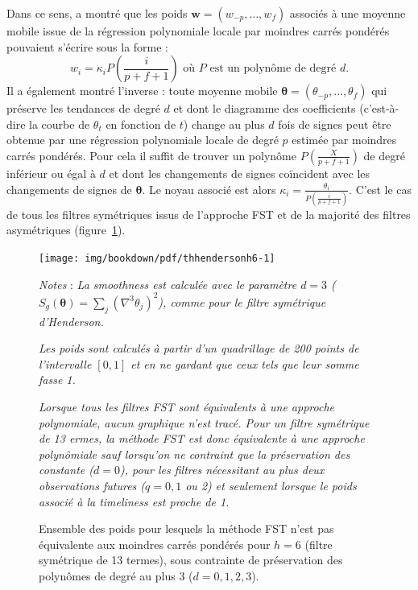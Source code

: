\documentclass[
  12pt,
  a4paper,french]{article}
\newcommand\1{\mathds{1}}
\begin{document}
Dans ce sens, \textcite{henderson1916note} a montré que les poids \(\boldsymbol w=(w_{-p},\dots, w_{f})\) associés à une moyenne mobile issue de la régression polynomiale locale par moindres carrés pondérés pouvaient s'écrire sous la forme :
\[
w_i = \kappa_i P\left(\frac{i}{p+f+1}\right)\text{ où }P\text{ est un polynôme de degré }d.
\]
Il a également montré l'inverse : toute moyenne mobile \(\boldsymbol \theta=(\theta_{-p},\dots, \theta_{f})\) qui préserve les tendances de degré \(d\) et dont le diagramme des coefficients (c'est-à-dire la courbe de \(\theta_t\) en fonction de \(t\)) change au plus \(d\) fois de signes peut être obtenue par une régression polynomiale locale de degré \(p\) estimée par moindres carrés pondérés.
Pour cela il suffit de trouver un polynôme \(P\left(\frac{X}{p+f+1}\right)\) de degré inférieur ou égal à \(d\) et dont les changements de signes coïncident avec les changements de signes de \(\boldsymbol \theta\).
Le noyau associé est alors \(\kappa_i=\frac{ \theta_i}{P\left(\frac{i}{p+f+1}\right)}\).
C'est le cas de tous les filtres symétriques issus de l'approche FST et de la majorité des filtres asymétriques (figure~\ref{fig:thhendersonh6}).

\begin{figure}[H]

{\centering \texttt{[image: img/bookdown/pdf/thhendersonh6-1]} 

}

\caption[Ensemble des poids pour lesquels la méthode FST n'est pas équivalente aux moindres carrés pondérés pour \(h=6\) (filtre symétrique de 13 termes), sous contrainte de préservation des polynômes de degré au plus 3 (\(d=0,1,2,3\))]{Ensemble des poids pour lesquels la méthode FST n'est pas équivalente aux moindres carrés pondérés pour \(h=6\) (filtre symétrique de 13 termes), sous contrainte de préservation des polynômes de degré au plus 3 (\(d=0,1,2,3\)).}\label{fig:thhendersonh6}

\footnotesize


\emph{Notes} : \emph{La \emph{smoothness} est calculée avec le paramètre \(d=3\) (\(S_g(\boldsymbol \theta) = \sum_{j}(\nabla^{3}\theta_{j})^{2}\)), comme pour le filtre symétrique d'Henderson.}

\emph{Les poids sont calculés à partir d'un quadrillage de 200 points de l'intervalle \([0,1]\) et en ne gardant que ceux tels que leur somme fasse 1.}

\emph{Lorsque tous les filtres FST sont équivalents à une approche polynomiale, aucun graphique n'est tracé. Pour un filtre symétrique de 13 ermes, la méthode FST est donc équivalente à une approche polynômiale sauf lorsqu'on ne contraint que la préservation des constante (\(d=0\)), pour les filtres nécessitant au plus deux observations futures (\(q=0,1\) ou 2) et seulement lorsque le poids associé à la \emph{timeliness} est proche de 1.}
\normalsize\end{figure}
\end{document}
